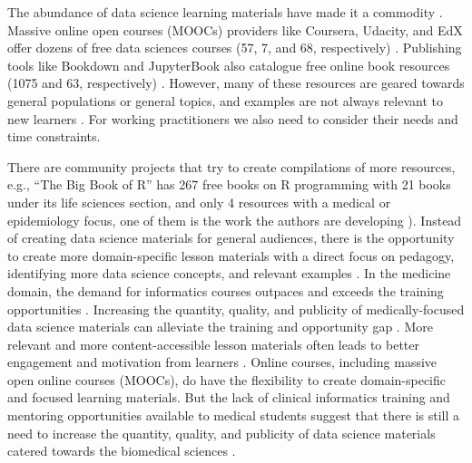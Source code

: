 \documentclass[020-persona\_validation.tex]{subfiles}
\begin{document}
    The abundance of data science learning materials have made it a commodity
    \cite{krossDemocratizationDataScience2020}.
    Massive online open courses (MOOCs) providers like
    Coursera,
    Udacity, and
    EdX
    offer dozens of free data sciences courses
    (57, 7, and 68, respectively)
    \cite{courseraTopFreeCourses, udacityDataScienceOnline, edxDataAnalysisCourses}.
    Publishing tools like Bookdown and
    JupyterBook
    also catalogue free online book resources
    (1075 and 63, respectively)
    \cite{bookdownAllBooksBookdown, executablebookprojectGalleryJupyterBooks}.
    However, many of these resources are geared towards general populations or general topics,
    and examples are not always relevant to new learners
    \cite{krossDemocratizationDataScience2020}.
    For working practitioners we also need to consider their needs and time constraints.

    There are community projects that try to create compilations of more resources,
    e.g., ``The Big Book of R'' has 267 free books on R programming with
    21 books under its life sciences section, and
    only 4 resources with a medical or epidemiology focus,
    one of them is the work the authors are developing \cite{baruffaBigBook2021}).
    Instead of creating data science materials for general audiences,
    there is the opportunity to create more domain-specific lesson materials
    with a direct focus on pedagogy,
    identifying more data science concepts,
    and relevant examples
    \cite{krossDemocratizationDataScience2020}.
    In the medicine domain, the demand for informatics courses outpaces and exceeds the training opportunities
    \cite{banerjeeMedicalStudentAwareness2015, americanmedicalassociationStudentInterestInformatics, americanmedicalassociationAcceleratingChangeMedical2021, americanmedicalassociationEducation}.
    Increasing the quantity, quality, and publicity of medically-focused
    data science materials can alleviate the training and opportunity gap
    \cite{banerjeeMedicalStudentAwareness2015, americanmedicalassociationAcceleratingChangeMedical2021}.
    More relevant and more content-accessible lesson materials often leads to better engagement and motivation from learners
    \cite{wilson2019teaching, ambrose2010learning, Koch2016}.
    Online courses, including massive open online courses (MOOCs),
    do have the flexibility to create
    domain-specific and focused learning materials.
    But the lack of clinical informatics training and mentoring opportunities available to medical students
    suggest that there is still a need to increase the quantity, quality, and publicity of
    data science materials catered towards the biomedical sciences
    \cite{banerjeeMedicalStudentAwareness2015}.
\end{document}
